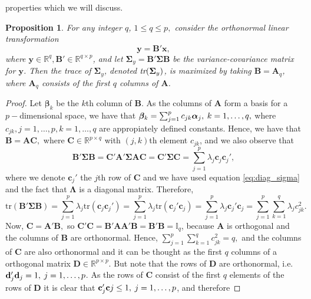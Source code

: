 \documentclass[11pt, oneside]{book}
\theoremstyle{plain}
\newtheorem{prop}{Proposition}[section]
\theoremstyle{remark}
\begin{document}
properties which we will discuss.
\begin{prop}\label{prop:max_sigma}
    For any integer $q$, $1\leq q\leq p,$ consider the orthonormal linear
    transformation $$\mathbf{y} = \mathbf{B'x},$$ where
    $\mathbf{y}\in\mathbb{R}^q, \mathbf{B'}\in\mathbb{R}^{q\times p}$, and let
    $\mathbf{\Sigma}_y = \mathbf{B'\Sigma B}$ be the variance-covariance matrix
    for $\mathbf{y}$. Then the trace of $\mathbf{\Sigma}_y$, denoted
    $\emph{tr}(\mathbf{\Sigma}_y)$, is maximized by taking $\mathbf{B} =
    \mathbf{A}_q$, where $\mathbf{A}_q$ consists of the first $q$ columns of
    $\mathbf{A}$.  
\end{prop}    
\begin{proof}
    Let $\bm{\beta}_k$ be the $k$th column of $\mathbf{B}$. As the columns of
    $\mathbf{A}$ form a basis for a $p-$dimensional space, we have that
    $\bm{\beta}_k = \sum_{j=1}^p c_{jk}\bm{\alpha}_j,\hspace{.25em}
    k=1,\dots,q,$ where $c_{jk}, j= 1,\dots,p, k=1,\dots, q$ are appropiately
    defined constants. Hence, we have that $\mathbf{B} = \mathbf{AC},$ where
    $\mathbf{C}\in\mathbb{R}^{p\times q}$ with $(j,k)$th element $c_{jk}$, and
    we also observe that $$\mathbf{B'\Sigma B} = \mathbf{C'A'\Sigma AC} =
    \mathbf{C'\Sigma C} = \sum_{j=1}^p\lambda_j\mathbf{c}_j\mathbf{c}_j',$$
    where we denote $\mathbf{c}_j'$ the $j$th row of $\mathbf{C}$ and we have
    used equation \eqref{eq:diag_sigma} and the fact that $\mathbf{\Lambda}$ is a
    diagonal matrix. Therefore, $$\text{tr}(\mathbf{B'\Sigma B}) =
    \sum_{j=1}^p\lambda_j \text{tr}(\mathbf{c}_j\mathbf{c}_j') =
    \sum_{j=1}^p\lambda_j \text{tr}(\mathbf{c}_j'\mathbf{c}_j) =
    \sum_{j=1}^p\lambda_j\mathbf{c}_j'\mathbf{c}_j =
    \sum_{j=1}^p\sum_{k=1}^q\lambda_j c_{jk}^2.$$ Now, $\mathbf{C} =
    \mathbf{A'B},$ so $\mathbf{C'C} = \mathbf{B'AA'B} = \mathbf{B'B} =
    \mathbb{I}_q$, because $\mathbf{A}$ is orthogonal and the columns of
    $\mathbf{B}$ are orthonormal. Hence, $\sum_{j=1}^p\sum_{k=1}^qc_{jk}^2 = q,$
    and the columns of $\mathbf{C}$ are also orthonormal and it can be thought
    as the first $q$ columns of a orthogonal matrix
    $\mathbf{D}\in\mathbb{R}^{p\times p}.$ But note that the rows of
    $\mathbf{D}$ are orthonormal, i.e. $\mathbf{d}_j'\mathbf{d}_j =
    1,\hspace{.25em} j=1,\dots, p$. As the rows of $\mathbf{C}$ consist of the
    first $q$ elements of the rows of $\mathbf{D}$ it is clear that
    $\mathbf{c}_j'\mathbf{c}j\leq 1,\hspace{.25em}j=1,\dots,p$, and therefore

\end{proof}
\end{document}
